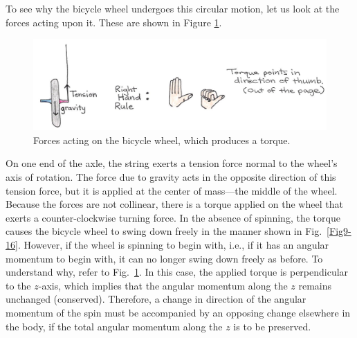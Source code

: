 To see why the bicycle wheel undergoes this circular motion, let us look at the forces acting upon it. These are shown in Figure \ref{Fig9-18}.
\begin{figure}[h]
	\centering
	\includegraphics[width=\textwidth]{./figures/Topic9/Fig9-18.jpg}
	\caption{Forces acting on the bicycle wheel, which produces a torque.}
 	\label{Fig9-18}
\end{figure} 
On one end of the axle, the string exerts a tension force normal to the wheel’s axis of rotation.  The force due to gravity acts in the opposite direction of this tension force, but it is applied at the center of mass—the middle of the wheel.  Because the forces are not collinear, there is a torque applied on the wheel that exerts a counter-clockwise turning force. In the absence of spinning, the torque causes the bicycle wheel to swing down freely in the manner shown in Fig.~\ref{Fig9-16}. However, if the wheel is spinning to begin with, i.e., if it has an angular momentum to begin with, it can no longer swing down freely as before. To understand why, refer to Fig.~\ref{Fig9-18}. In this case, the applied torque is perpendicular to the $z$-axis, which implies that the angular momentum along the $z$ remains unchanged (conserved). Therefore, a change in direction of the angular momentum of the spin must be accompanied by an opposing change elsewhere in the body, if the total angular momentum along the $z$ is to be preserved.
